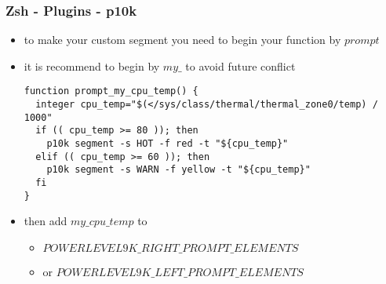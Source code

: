 \subsubsection{Zsh - Plugins - p10k}
\begin{frame}[fragile]{\subsubsecname}
  \begin{itemize}
  \item to make your custom segment you need to begin your function by $prompt$
  \item it is recommend to begin by $my\_$ to avoid future conflict
  \begin{lstlisting}
function prompt_my_cpu_temp() {
  integer cpu_temp="$(</sys/class/thermal/thermal_zone0/temp) / 1000"
  if (( cpu_temp >= 80 )); then
    p10k segment -s HOT -f red -t "${cpu_temp}"
  elif (( cpu_temp >= 60 )); then
    p10k segment -s WARN -f yellow -t "${cpu_temp}"
  fi
}
  \end{lstlisting}
  \item then add $my\_cpu\_temp$ to
  \begin{itemize}
    \item $POWERLEVEL9K\_RIGHT\_PROMPT\_ELEMENTS$
    \item or $POWERLEVEL9K\_LEFT\_PROMPT\_ELEMENTS$
  \end{itemize}
\end{itemize}
\end{frame}
